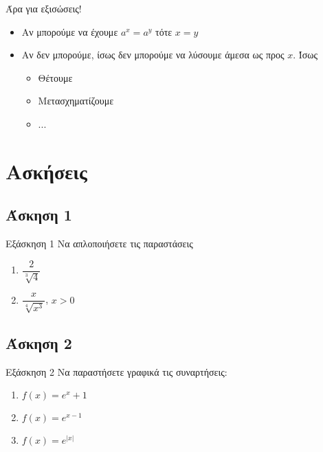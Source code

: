 \documentclass[greek]{beamer}
\begin{document}
\begin{frame}{Άρα για εξισώσεις!}
 \begin{itemize}
  \item<1-> Αν μπορούμε να έχουμε $a^x=a^y$ τότε $x=y$
  \item<2-> Αν δεν μπορούμε, ίσως δεν μπορούμε να λύσουμε άμεσα ως προς $x$. Ίσως
   \begin{itemize}
    \item<3-> Θέτουμε
    \item<4-> Μετασχηματίζουμε
    \item<4-> ...
   \end{itemize}
 \end{itemize}
\end{frame}

\section{Ασκήσεις}
\subsection{Άσκηση 1}
\begin{frame}[label=Άσκηση1,t]{Εξάσκηση 1}
 Να απλοποιήσετε τις παραστάσεις
 \begin{enumerate}
  \item<1-> $\dfrac{2}{\sqrt[3]{4}}$
  \item<2-> $\dfrac{x}{\sqrt[4]{x^3}}$, $x>0$
 \end{enumerate}

\end{frame}

\subsection{Άσκηση 2}
\begin{frame}[label=Άσκηση2,t]{Εξάσκηση 2}
 Να παραστήσετε γραφικά τις συναρτήσεις:
 \begin{enumerate}
  \item<1-> $f(x)=e^x+1$
  \item<2-> $f(x)=e^{x-1}$
  \item<3-> $f(x)=e^{|x|}$
 \end{enumerate}

\end{frame}
\end{document}
